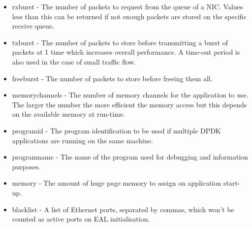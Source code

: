 \documentclass[final_report.tex]{subfiles}
\begin{document}
\begin{itemize}
	\item rxburst - The number of packets to request from the queue of a NIC. Values less than this can be returned if not enough packets are stored on the specific receive queue.
	\item txburst - The number of packets to store before transmitting a burst of packets at 1 time which increases overall performance. A time-out period is also used in the case of small traffic flow.
	\item freeburst - The number of packets to store before freeing them all.
	\item memorychannels - The number of memory channels for the application to use. The larger the number the more efficient the memory access but this depends on the available memory at run-time.
	\item programid - The program identification to be used if multiple DPDK applications are running on the same machine.
	\item programname - The name of the program used for debugging and information purposes.
	\item memory - The amount of huge page memory to assign on application start-up.
	\item blacklist - A list of Ethernet ports, separated by commas, which won't be counted as active ports on EAL initialisation.
\end{itemize}
\end{document}
